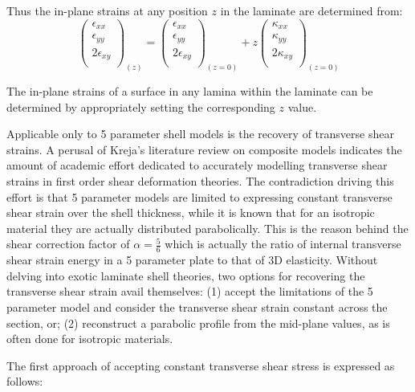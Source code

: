 Thus the in-plane strains at any position $z$ in the laminate are determined from:
\begin{equation} 
\begin{pmatrix}
\epsilon_{xx} \\
\epsilon_{yy} \\
2\epsilon_{xy}\\
\end{pmatrix}_{(z)}
=
\begin{pmatrix}
\epsilon_{xx} \\
\epsilon_{yy} \\
2\epsilon_{xy}\\
\end{pmatrix}_{(z=0)}
+
z
\begin{pmatrix}
\kappa_{xx}\\
\kappa_{yy}\\
2\kappa_{xy} \\
\end{pmatrix}_{(z=0)}
\label{eqscomp_strain_recovery2}
\end{equation}

The in-plane strains of a surface in any lamina within the laminate can be determined by appropriately setting the corresponding $z$ value.

Applicable only to 5 parameter shell models is the recovery of transverse shear strains. A perusal of Kreja's literature review on composite models \cite{kreja2011literature} indicates the amount of academic effort dedicated to accurately modelling transverse shear strains in first order shear deformation theories. The contradiction driving this effort is that 5 parameter models are limited to expressing constant transverse shear strain over the shell thickness, while it is known that for an isotropic material they are actually distributed parabolically. This is the reason behind the shear correction factor of $\alpha = \frac{5}{6}$ which is actually the ratio of internal transverse shear strain energy in a 5 parameter plate to that of 3D elasticity. Without delving into exotic laminate shell theories, two options for recovering the transverse shear strain avail themselves: (1) accept the limitations of the 5 parameter model and consider the transverse shear strain constant across the section, or; (2) reconstruct a parabolic profile from the mid-plane values, as is often done for isotropic materials.

The first approach of accepting constant transverse shear stress is expressed as follows:

